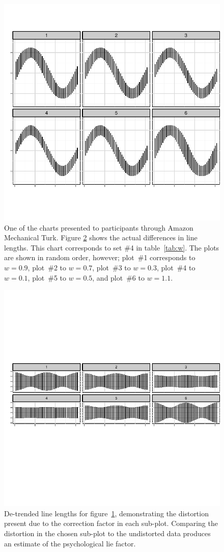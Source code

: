 \documentclass[11pt]{isuthesis}\usepackage[]{graphicx}\usepackage[]{color}
\begin{document}
\begin{figure}
\centering
\includegraphics[width=.8\linewidth]{fig-stimulicorrectionsize1}
\caption[Sample experimental stimulus]{One of the charts presented to participants through Amazon Mechanical Turk. Figure \ref{fig:sinestimulinotrend} shows the actual differences in line lengths. This chart corresponds to set \#4 in table~\ref{tab:w}. The plots are shown in random order, however; plot~\#1 corresponds to $w=0.9$, plot~\#2 to $w=0.7$, plot~\#3 to $w=0.3$, plot~\#4 to $w=0.1$, plot~\#5 to $w=0.5$, and plot~\#6 to $w=1.1$.}\label{fig:sinestimuli}
\end{figure}

\begin{figure}
\centering
\includegraphics[width=.6\linewidth, trim=.65in 0in .65in 0in]{fig-stimulicorrectionsize2}
\caption[The effect of the transformation]{De-trended line lengths for figure~\ref{fig:sinestimuli}, demonstrating the distortion present due to the correction factor in each sub-plot. Comparing the distortion in the chosen sub-plot to the undistorted data produces an estimate of the psychological lie factor. }\label{fig:sinestimulinotrend}
\end{figure}
\end{document}
